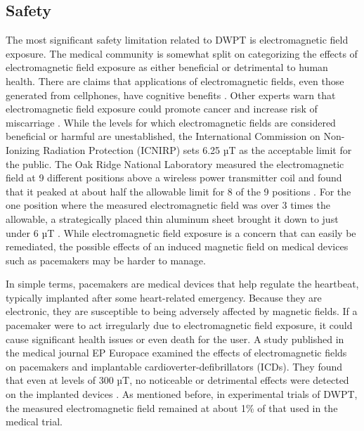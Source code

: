 \subsection{Safety}
The most significant safety limitation related to DWPT is electromagnetic field exposure. The medical community is 
somewhat split on categorizing the effects of electromagnetic field exposure as either beneficial or detrimental to 
human health. There are claims that applications of electromagnetic fields, even those generated from cellphones, 
have cognitive benefits \cite{arendash_electromagnetic_2010}. Other experts warn that electromagnetic field exposure could promote 
cancer and increase risk of miscarriage \cite{kostoff_combined_2013}. While the levels for which electromagnetic fields are 
considered beneficial or harmful are unestablished, the International Commission on Non-Ionizing Radiation Protection 
(ICNIRP) sets 6.25 µT as the acceptable limit for the public.  The Oak Ridge National Laboratory measured the 
electromagnetic field at 9 different positions above a wireless power transmitter coil and found that it peaked at 
about half the allowable limit for 8 of the 9 positions \cite{onar_novel_2013}. For the one position where the measured 
electromagnetic field was over 3 times the allowable, a strategically placed thin aluminum sheet brought it down to 
just under 6 µT \cite{onar_novel_2013}. While electromagnetic field exposure is a concern that can easily be remediated, 
the possible effects of an induced magnetic field on medical devices such as pacemakers may be harder to manage.

In simple terms, pacemakers are medical devices that help regulate the heartbeat, typically implanted after some 
heart-related emergency. Because they are electronic, they are susceptible to being adversely affected by magnetic 
fields. If a pacemaker were to act irregularly due to electromagnetic field exposure, it could cause significant 
health issues or even death for the user. A study published in the medical journal EP Europace examined the effects 
of electromagnetic fields on pacemakers and implantable cardioverter-defibrillators (ICDs). They found that even at 
levels of 300 µT, no noticeable or detrimental effects were detected on the implanted devices 
\cite{tiikkaja_electromagnetic_2013}. As mentioned before, in experimental trials of DWPT, the measured electromagnetic 
field remained at about 1\% of that used in the medical trial.

